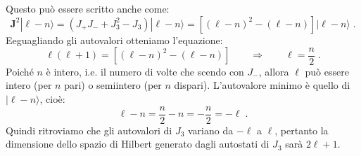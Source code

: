 \documentclass[10pt,a4paper]{report}
\theoremstyle{definition}
\numberwithin{equation}{section}
\newcommand{\ket}{\rangle}
\begin{document}
Questo può essere scritto anche come:
\begin{equation}
\mathbf{J}^2|\ell-n\ket=(J_+J_-+J_3^2-J_3)|\ell-n\ket=[(\ell-n)^2-(\ell-n)]|\ell-n\ket\;.
\end{equation}
Eeguagliando gli autovalori otteniamo l'equazione:
\begin{equation}
\ell(\ell+1)=[(\ell-n)^2-(\ell-n)] \qquad \Longrightarrow \qquad \ell=\frac{n}{2}\;.
\end{equation}
Poiché $n$ è intero, i.e. il numero di volte che scendo con $J_-$, allora $\ell$ può essere intero (per $n$ pari) o semiintero (per $n$ dispari). L'autovalore minimo è quello di $|\ell-n\ket$, cioè:
\begin{equation}
\ell-n=\frac{n}{2}-n=-\frac{n}{2}=-\ell\;.
\end{equation}
Quindi ritroviamo che gli autovalori di $J_3$ variano da $-\ell$ a $\ell$, pertanto la dimensione dello spazio di Hilbert generato dagli autostati di $J_3$ sarà $2\ell+1$.
\end{document}
